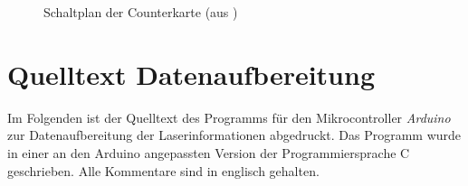 \begin{landscape}
	\begin{figure}
	 	\centering
		\caption[Counterkarte -
		Schaltplan]{Schaltplan der Counterkarte (aus \cite{counterkarte_laserstabilisierung})}\label{fig:counterkarte_schaltplan}
	\end{figure}
\end{landscape}

\chapter{Quelltext Datenaufbereitung}\label{anh:kap:quelltext_arduino_laserinformationsverarbeitung}
Im Folgenden ist der Quelltext des Programms für den Mikrocontroller
\textit{Arduino} zur Datenaufbereitung der Laserinformationen abgedruckt. Das
Programm wurde in einer an den Arduino angepassten Version der
Programmiersprache C geschrieben. Alle Kommentare sind in englisch gehalten.
